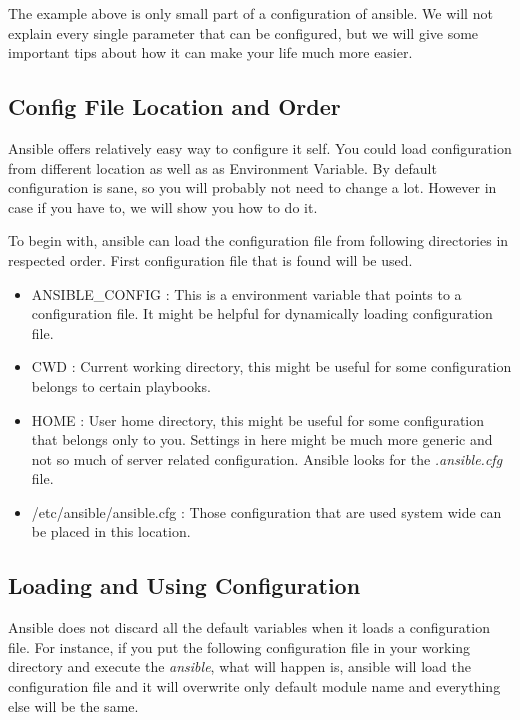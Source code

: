 \documentclass[10pt]{book}
\begin{document}
The example above is only small part of a configuration of ansible. We will not 
explain every single parameter that can be configured, but we will give some 
important tips about how it can make your life much more easier.

\subsection{Config File Location and Order}
Ansible offers relatively easy way to configure it self. You could load 
configuration from different location as well as as Environment Variable. By 
default configuration is sane, so you will probably not need to change a lot. 
However in case if you have to, we will show you how to do it.

To begin with, ansible can load the configuration file from following 
directories in respected order. First configuration file that is found will be 
used.

\begin{itemize}
\item ANSIBLE\_CONFIG : This is a environment variable that points to a configuration file. It might be helpful
for dynamically loading configuration file.

\item  CWD : Current working directory, this might be useful for some 
configuration belongs to certain playbooks.

\item HOME : User home directory, this might be useful for some 
configuration that belongs only to you. Settings in here might be much more 
generic and not so much of server related configuration. Ansible looks for the \emph{.ansible.cfg} 
file.

\item /etc/ansible/ansible.cfg : Those configuration that are used system wide can be placed in 
this location.
\end{itemize}


\subsection{Loading and Using Configuration}
Ansible does not discard all the default variables when it loads a configuration file. 
For instance, if you put the following configuration file in your working 
directory and execute the \emph{ansible}, what will happen is, ansible will load 
the configuration file and it will overwrite only default module name and 
everything else will be the same.
\end{document}
